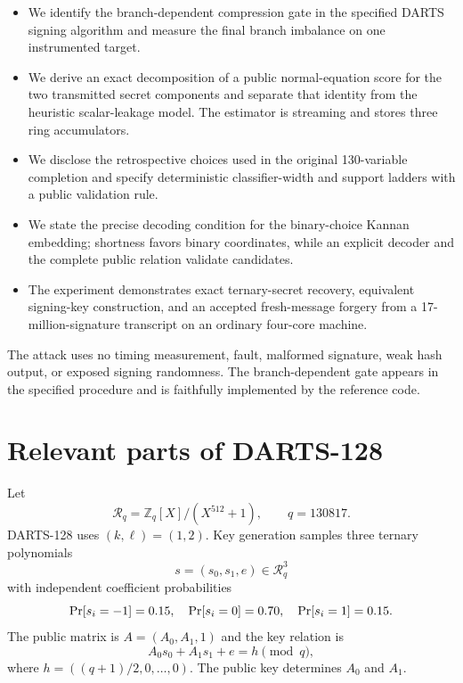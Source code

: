 \documentclass[11pt,a4paper]{article}
\newcommand{\Z}{\mathbb{Z}}
\newcommand{\R}{\mathcal{R}}
\newcommand{\Prb}{\mathop{\rm Pr}}
\begin{document}
\begin{itemize}[leftmargin=1.5em]
  \item We identify the branch-dependent compression gate in the specified
        DARTS signing algorithm and measure the final branch imbalance on one
        instrumented target.
  \item We derive an exact decomposition of a public normal-equation score
        for the two transmitted secret components and separate that identity
        from the heuristic scalar-leakage model.  The estimator is streaming
        and stores three ring accumulators.
  \item We disclose the retrospective choices used in the original
        130-variable completion and specify deterministic classifier-width
        and support ladders with a public validation rule.
  \item We state the precise decoding condition for the binary-choice Kannan
        embedding; shortness favors binary coordinates, while an explicit
        decoder and the complete public relation validate candidates.
  \item The experiment demonstrates exact ternary-secret recovery,
        equivalent signing-key construction, and an accepted fresh-message
        forgery from a 17-million-signature transcript on an ordinary
        four-core machine.
\end{itemize}

The attack uses no timing measurement, fault, malformed signature, weak hash
output, or exposed signing randomness.  The branch-dependent gate appears in
the specified procedure and is faithfully implemented by the reference code.

\section{Relevant parts of DARTS-128}
\label{sec:darts}

Let
\[
       \R_q=\Z_q[X]/(X^{512}+1), \qquad q=130817.
\]
DARTS-128 uses $(k,\ell)=(1,2)$.  Key generation samples three ternary
polynomials
\[
                    s=(s_0,s_1,e)\in\R_q^3
\]
with independent coefficient probabilities
\[
  \Prb[s_i=-1]=0.15,\quad
  \Prb[s_i=0]=0.70,\quad
  \Prb[s_i=1]=0.15.
\]
The public matrix is $A=(A_0,A_1,1)$ and the key relation is
\begin{equation}
                  A_0s_0+A_1s_1+e=h\pmod q,
\label{eq:public-relation}
\end{equation}
where $h=((q+1)/2,0,\ldots,0)$.  The public key determines $A_0$ and $A_1$.
\end{document}
